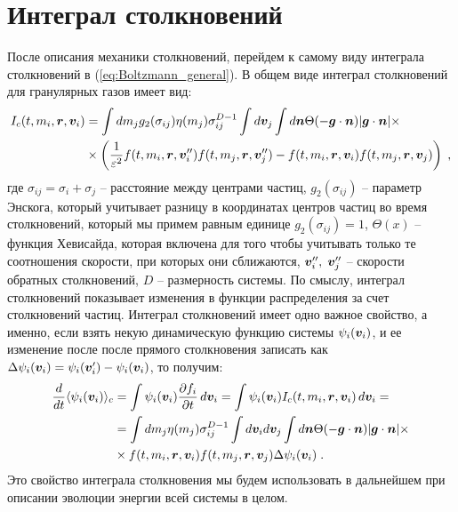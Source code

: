 \section{Интеграл столкновений}
После описания механики столкновений, перейдем к самому виду интеграла столкновений в (\ref{eq:Boltzmann_general}).
В общем виде интеграл столкновений для гранулярных газов имеет вид:
\begin{equation}
  \begin{split}
    I_c(t,m_i,\bm{r},\bm{v}_i) &= \int dm_jg_2(\sigma_{ij})\eta(m_j)\sigma^{D-1}_{ij}\int d\bm{v}_j\int d\bm{n}\Theta(-\bm{g}\cdot\bm{n})\vert\bm{g}\cdot\bm{n}\vert\times\\
    &\times\left(\frac{1}{\varepsilon^2}f(t,m_i,\bm{r},\bm{v}''_i)f(t,m_j,\bm{r},\bm{v}''_j)-f(t,m_i,\bm{r},\bm{v}_i)f(t,m_j,\bm{r},\bm{v}_j)\right)\;,
  \end{split}
\end{equation}
где $\sigma_{ij}=\sigma_i+\sigma_j$ -- расстояние между центрами частиц, $g_2(\sigma_{ij})$ -- параметр Энскога, который учитывает
разницу в координатах центров частиц во время столкновений, который мы примем равным единице $g_2(\sigma_{ij})=1$, $\Theta(x)$ -- 
функция Хевисайда, которая включена для того чтобы учитывать только те соотношения скорости, при которых они сближаются, 
$\bm{v}''_i,\;\bm{v}''_j$ -- скорости обратных столкновений, $D$ -- размерность системы. По смыслу, интеграл столкновений показывает изменения 
в функции распределения за счет столкновений частиц. Интеграл столкновений имеет одно важное свойство, а именно, если взять некую 
динамическую функцию системы $\psi_i(\bm{v}_i)$, и ее изменение после после прямого столкновения записать как 
$\Delta\psi_i(\bm{v}_i)=\psi_i(\bm{v}'_i)-\psi_i(\bm{v}_i)$, то получим:
\begin{equation}\label{eq:collision_integral_dynamic_function}
  \begin{split}
    \frac{d}{dt}\langle\psi_i(\bm{v}_i)\rangle_c &= \int\psi_i(\bm{v}_i)\frac{\partial f_i}{\partial t}\,d\bm{v}_i = \int\psi_i(\bm{v}_i)I_c(t,m_i,\bm{r},\bm{v}_i)\,d\bm{v}_i=\\
    &=\int dm_j\eta(m_j)\sigma^{D-1}_{ij}\int d\bm{v}_id\bm{v}_j\int d\bm{n}\Theta(-\bm{g}\cdot\bm{n})\vert\bm{g}\cdot\bm{n}\vert\times\\
    &\times f(t,m_i,\bm{r},\bm{v}_i)f(t,m_j,\bm{r},\bm{v}_j)\Delta\psi_i(\bm{v}_i)\;.
  \end{split}
\end{equation}
Это свойство интеграла столкновения мы будем использовать в дальнейшем при описании эволюции энергии всей системы в целом.




